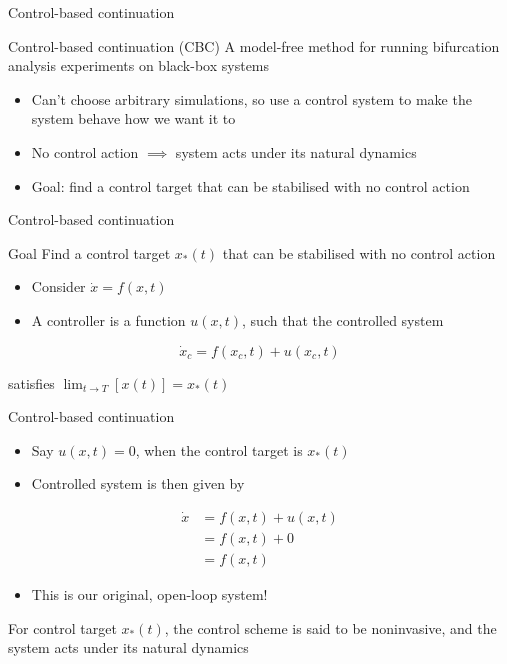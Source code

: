 \documentclass[presentation]{beamer}
\begin{document}
\begin{frame}[label={sec:orge090dc8}]{Control-based continuation}
\begin{block}{Control-based continuation (CBC)}
    A model-free method for running bifurcation analysis experiments on black-box systems
\end{block}

\begin{itemize}[<+->]
\item Can't choose arbitrary simulations, so use a control system to make the system behave how we want it to
\item No control action \(\implies\) system acts under its natural dynamics
\item Goal: find a control target that can be stabilised with no control action
\end{itemize}
\end{frame}

\begin{frame}[label={sec:org7309cb1}]{Control-based continuation}
\begin{block}{Goal}
    Find a control target \(x_*(t)\) that can be stabilised with no control action
\end{block}

\begin{itemize}
\item Consider \(\dot{x} = f(x,t)\)
\item A controller is a function \(u(x,t)\), such that the controlled system
\end{itemize}

\begin{equation}
\dot{x}_c = f(x_c,t) + u(x_c,t)
\end{equation}

satisfies \(\lim_{t\to T}\left[x(t)\right] = x_*(t)\)
\end{frame}

\begin{frame}[label={sec:org9549eec}]{Control-based continuation}
\begin{itemize}
\item Say \(u(x,t) = 0\), when the control target is \(x_*(t)\)
\item Controlled system is then given by
\end{itemize}
\begin{align}
\dot{x} &= f(x,t) + u(x,t) \nonumber \\
&= f(x,t) + 0 \nonumber \\
&= f(x,t)\nonumber
\end{align}

\begin{itemize}
\item This is our original, open-loop system!
\end{itemize}

For control target \(x_*(t)\), the control scheme is said to be noninvasive, and the system acts under its natural dynamics
\end{frame}
\end{document}
